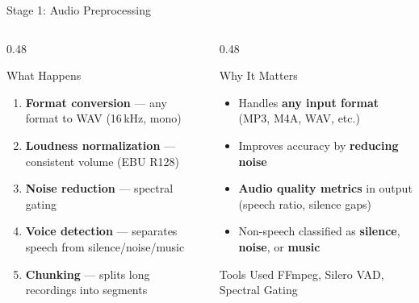 \documentclass[aspectratio=169, 11pt]{beamer}
\begin{document}
\begin{frame}{Stage 1: Audio Preprocessing}
    \begin{columns}[T]
        \begin{column}{0.48\textwidth}
            \begin{block}{What Happens}
                \scriptsize
                \begin{enumerate}
                    \item \textbf{Format conversion} --- any format to WAV (16\,kHz, mono)
                    \item \textbf{Loudness normalization} --- consistent volume (EBU R128)
                    \item \textbf{Noise reduction} --- spectral gating
                    \item \textbf{Voice detection} --- separates speech from silence/noise/music
                    \item \textbf{Chunking} --- splits long recordings into segments
                \end{enumerate}
            \end{block}
        \end{column}
        \begin{column}{0.48\textwidth}
            \begin{block}{Why It Matters}
                \scriptsize
                \begin{itemize}
                    \item Handles \textbf{any input format} (MP3, M4A, WAV, etc.)
                    \item Improves accuracy by \textbf{reducing noise}
                    \item \textbf{Audio quality metrics} in output (speech ratio, silence gaps)
                    \item Non-speech classified as \textbf{silence}, \textbf{noise}, or \textbf{music}
                \end{itemize}
            \end{block}
            \vspace{0.3em}
            \begin{exampleblock}{Tools Used}
                FFmpeg, Silero VAD, Spectral Gating
            \end{exampleblock}
        \end{column}
    \end{columns}
\end{frame}
\end{document}
